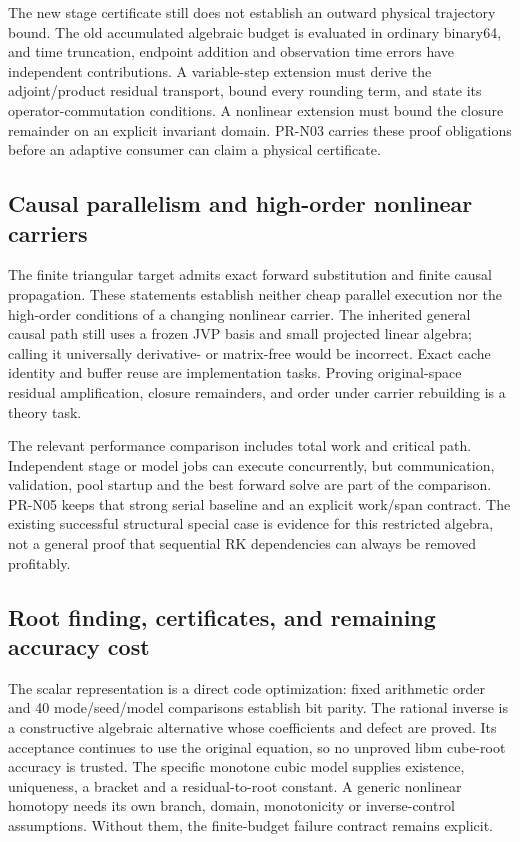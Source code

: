 \documentclass[aps,pra,reprint,onecolumn,12pt,notitlepage,superscriptaddress,nofootinbib]{revtex4-2}
\begin{document}
The new stage certificate still does not establish an outward physical
trajectory bound. The old accumulated algebraic budget is evaluated in
ordinary binary64, and time truncation, endpoint addition and observation
time errors have independent contributions. A variable-step extension must
derive the adjoint/product residual transport, bound every rounding term,
and state its operator-commutation conditions. A nonlinear extension must
bound the closure remainder on an explicit invariant domain. PR-N03 carries
these proof obligations before an adaptive consumer can claim a physical
certificate.

\subsection{Causal parallelism and high-order nonlinear carriers}
The finite triangular target admits exact forward substitution and finite
causal propagation. These statements establish neither cheap parallel
execution nor the high-order conditions of a changing nonlinear carrier.
The inherited general causal path still uses a frozen JVP basis and small
projected linear algebra; calling it universally derivative- or matrix-free
would be incorrect. Exact cache identity and buffer reuse are implementation
tasks. Proving original-space residual amplification, closure remainders,
and order under carrier rebuilding is a theory task.

The relevant performance comparison includes total work and critical path.
Independent stage or model jobs can execute concurrently, but communication,
validation, pool startup and the best forward solve are part of the
comparison. PR-N05 keeps that strong serial baseline and an explicit
work/span contract. The existing successful structural special case is
evidence for this restricted algebra, not a general proof that sequential
RK dependencies can always be removed profitably.

\subsection{Root finding, certificates, and remaining accuracy cost}
The scalar representation is a direct code optimization: fixed arithmetic
order and 40 mode/seed/model comparisons establish bit parity. The rational
inverse is a constructive algebraic alternative whose coefficients and
defect are proved. Its acceptance continues to use the original equation,
so no unproved libm cube-root accuracy is trusted. The specific monotone
cubic model supplies existence, uniqueness, a bracket and a residual-to-root
constant. A generic nonlinear homotopy needs its own branch, domain,
monotonicity or inverse-control assumptions. Without them, the finite-budget
failure contract remains explicit.
\end{document}
